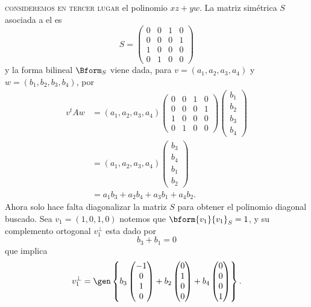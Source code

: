 	\textsc{consideremos en tercer lugar} el polinomio $xz+yw$. La matriz simétrica $S$ asociada a el es
	\[ S = \begin{pmatrix}
	0 & 0 & 1 & 0 \\
	0 & 0 & 0 & 1 \\
	1 & 0 & 0 & 0 \\
	0 & 1 & 0 & 0
	\end{pmatrix} \]
	y la forma bilineal $\Bform_S$ viene dada,  para $v=(a_1,a_2,a_3,a_4)$ y $w=(b_1,b_2,b_3,b_4)$, por
	\begin{align*}
	v^tAw &= (a_1,a_2,a_3,a_4)  \begin{pmatrix}
	0 & 0 & 1 & 0 \\
	0 & 0 & 0 & 1 \\
	1 & 0 & 0 & 0 \\
	0 & 1 & 0 & 0
	\end{pmatrix} \begin{pmatrix}
	b_1 \\ b_2 \\ b_3 \\ b_4
	\end{pmatrix} \\
	&= (a_1,a_2,a_3,a_4)  \begin{pmatrix}
	b_3 \\ b_4 \\ b_1\\ b_2 
	\end{pmatrix} \\
	&= a_1b_3 + a_2b_4 + a_3b_1 + a_4b_2.
	\end{align*}
	Ahora solo hace falta diagonalizar la matriz $S$ para obtener el polinomio diagonal buscado. Sea $v_1 = (1,0,1,0)$ notemos que $\bform{v_1}{v_1}_S = 1$, y su complemento ortogonal $v_1^\perp$ esta dado por
	\[ b_3+b_1 = 0 \]
	que implica
	\[ v_1^\perp = \gen \left\{ b_3\begin{pmatrix}
	-1 \\ 0 \\ 1 \\ 0
	\end{pmatrix}+ b_2\begin{pmatrix}
	0 \\ 1 \\ 0 \\ 0
	\end{pmatrix}+b_4\begin{pmatrix}
	0 \\ 0 \\ 0 \\ 1
	\end{pmatrix} \right\}. \]
